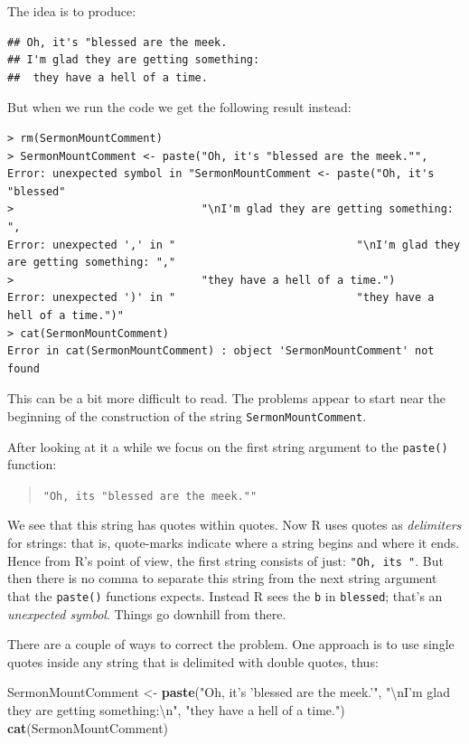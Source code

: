 \documentclass[]{book}
\makeatletter
\newenvironment{Shaded}{\begin{snugshade}}{\end{snugshade}}
\newcommand{\KeywordTok}[1]{\textcolor[rgb]{0.13,0.29,0.53}{\textbf{{#1}}}}
\newcommand{\CharTok}[1]{\textcolor[rgb]{0.31,0.60,0.02}{{#1}}}
\newcommand{\StringTok}[1]{\textcolor[rgb]{0.31,0.60,0.02}{{#1}}}
\newcommand{\NormalTok}[1]{{#1}}
\newenvironment{kframe}{%
\medskip{}
\setlength{\fboxsep}{.8em}
 \def\at@end@of@kframe{}%
 \ifinner\ifhmode%
  \def\at@end@of@kframe{\end{minipage}}%
  \begin{minipage}{\columnwidth}%
 \fi\fi%
 \def\FrameCommand##1{\hskip\@totalleftmargin \hskip-\fboxsep
 \colorbox{shadecolor}{##1}\hskip-\fboxsep
     \hskip-\linewidth \hskip-\@totalleftmargin \hskip\columnwidth}%
 \MakeFramed {\advance\hsize-\width
   \@totalleftmargin\z@ \linewidth\hsize
   \@setminipage}}%
 {\par\unskip\endMakeFramed%
 \at@end@of@kframe}
\renewenvironment{Shaded}{\begin{kframe}}{\end{kframe}}
\theoremstyle{definition}
\theoremstyle{definition}
\theoremstyle{remark}
\makeatother
\begin{document}
The idea is to produce:

\begin{verbatim}
## Oh, it's "blessed are the meek.
## I'm glad they are getting something:
##  they have a hell of a time.
\end{verbatim}

But when we run the code we get the following result instead:

\begin{verbatim}
> rm(SermonMountComment)
> SermonMountComment <- paste("Oh, it's "blessed are the meek."",
Error: unexpected symbol in "SermonMountComment <- paste("Oh, it's "blessed"
>                             "\nI'm glad they are getting something: ",
Error: unexpected ',' in "                            "\nI'm glad they are getting something: ","
>                             "they have a hell of a time.")
Error: unexpected ')' in "                            "they have a hell of a time.")"
> cat(SermonMountComment)
Error in cat(SermonMountComment) : object 'SermonMountComment' not found
\end{verbatim}

This can be a bit more difficult to read. The problems appear to start
near the beginning of the construction of the string
\texttt{SermonMountComment}.

After looking at it a while we focus on the first string argument to the
\texttt{paste()} function:

\begin{quote}
\texttt{"Oh,\ it\textquotesingle{}s\ "blessed\ are\ the\ meek.""}
\end{quote}

We see that this string has quotes within quotes. Now R uses quotes as
\emph{delimiters}  for strings: that is, quote-marks
indicate where a string begins and where it ends. Hence from R's point
of view, the first string consists of just:
\texttt{"Oh,\ it\textquotesingle{}s\ "}. But then there is no comma to
separate this string from the next string argument that the
\texttt{paste()} functions expects. Instead R sees the \texttt{b} in
\texttt{blessed}; that's an \emph{unexpected symbol}. Things go downhill
from there.

There are a couple of ways to correct the problem. One approach is to
use single quotes inside any string that is delimited with double
quotes, thus:

\begin{Shaded}
\begin{Highlighting}[]
\NormalTok{SermonMountComment <-}\StringTok{ }\KeywordTok{paste}\NormalTok{(}\StringTok{"Oh, it's 'blessed are the meek.'"}\NormalTok{,}
                     \StringTok{"}\CharTok{\textbackslash{}n}\StringTok{I'm glad they are getting something:}\CharTok{\textbackslash{}n}\StringTok{"}\NormalTok{,}
                     \StringTok{"they have a hell of a time."}\NormalTok{)}
\KeywordTok{cat}\NormalTok{(SermonMountComment)}
\end{Highlighting}
\end{Shaded}
\end{document}
